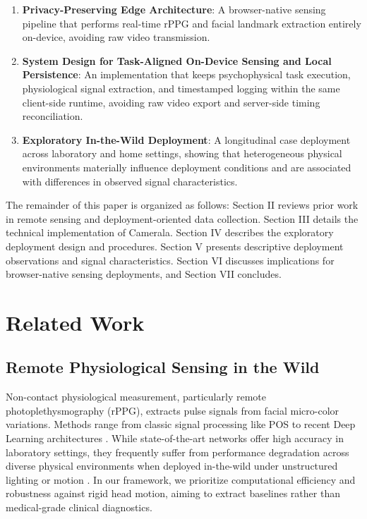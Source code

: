 \documentclass[final,3p,times,twocolumn]{elsarticle}
\begin{document}
\begin{enumerate}
    \item \textbf{Privacy-Preserving Edge Architecture}: A browser-native sensing pipeline that performs real-time rPPG and facial landmark extraction entirely on-device, avoiding raw video transmission.
    \item \textbf{System Design for Task-Aligned On-Device Sensing and Local Persistence}: An implementation that keeps psychophysical task execution, physiological signal extraction, and timestamped logging within the same client-side runtime, avoiding raw video export and server-side timing reconciliation.
    \item \textbf{Exploratory In-the-Wild Deployment}: A longitudinal case deployment across laboratory and home settings, showing that heterogeneous physical environments materially influence deployment conditions and are associated with differences in observed signal characteristics.
\end{enumerate}

The remainder of this paper is organized as follows: Section II reviews prior work in remote sensing and deployment-oriented data collection. 
Section III details the technical implementation of Camerala. Section IV describes the exploratory deployment design and procedures. 
Section V presents descriptive deployment observations and signal characteristics. Section VI discusses implications for browser-native sensing deployments, and Section VII concludes.

\section{Related Work}

\subsection{Remote Physiological Sensing in the Wild}
Non-contact physiological measurement, particularly remote photoplethysmography (rPPG), extracts pulse signals from facial micro-color variations. Methods range from classic signal processing like POS \cite{wang_pos} to recent Deep Learning architectures \cite{deepphys}. While state-of-the-art networks offer high accuracy in laboratory settings, they frequently suffer from performance degradation across diverse physical environments when deployed in-the-wild under unstructured lighting or motion \cite{mcduff_rppg}. In our framework, we prioritize computational efficiency and robustness against rigid head motion, aiming to extract baselines rather than medical-grade clinical diagnostics.
\end{document}
